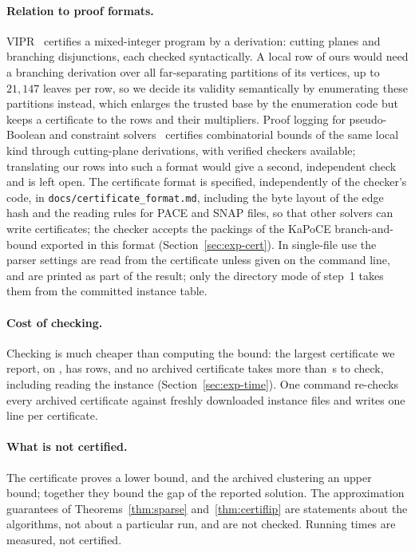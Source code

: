 \paragraph{Relation to proof formats.}  VIPR~\cite{CheungGS17vipr} certifies
a mixed-integer program by a derivation: cutting planes and branching
disjunctions, each checked syntactically.  A local row of ours would need a
branching derivation over all far-separating partitions of its vertices, up
to $21{,}147$ leaves per row, so we decide its validity semantically by
enumerating these partitions instead, which enlarges the trusted base by the
enumeration code but keeps a certificate to the rows and their multipliers.
Proof logging for pseudo-Boolean and constraint
solvers~\cite{GochtN21veripb,GochtMMNPT20} certifies combinatorial bounds of
the same local kind through cutting-plane derivations, with verified checkers
available; translating our rows into such a format would give a second,
independent check and is left open.  The certificate format is specified,
independently of the checker's code, in
\texttt{docs/certificate\_format.md}, including the byte layout of the edge
hash and the reading rules for PACE and SNAP files, so that other solvers can
write certificates; the checker accepts the packings of the KaPoCE
branch-and-bound exported in this format (Section~\ref{sec:exp-cert}).  In
single-file use the parser settings are read from the certificate unless
given on the command line, and are printed as part of the result; only the
directory mode of step~1 takes them from the committed instance table.

\paragraph{Cost of checking.}  Checking is much cheaper than computing the
bound: the largest certificate we report, on \texttt{\numCheckMaxGraph}, has
\numCheckMaxRows{} rows, and no archived certificate takes more than
\numRecheckMax{}\,s to check, including reading the instance
(Section~\ref{sec:exp-time}).  One command re-checks every archived
certificate against freshly downloaded instance files and writes one line per
certificate.

\paragraph{What is not certified.}  The certificate proves a lower bound, and
the archived clustering an upper bound; together they bound the gap of the
reported solution.  The approximation guarantees of Theorems~\ref{thm:sparse}
and~\ref{thm:certiflip} are statements about the algorithms, not about a
particular run, and are not checked.  Running times are measured, not
certified.
